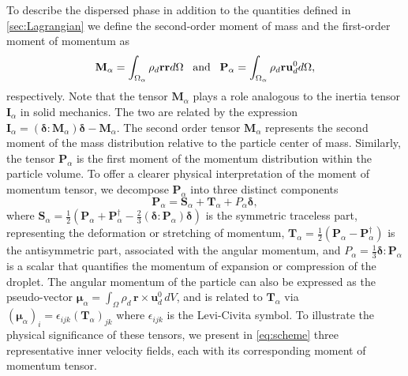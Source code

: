 To describe the dispersed phase in addition to the quantities defined in \ref{sec:Lagrangian} we define the second-order moment of mass and the first-order moment of momentum as 
\begin{equation}
    \textbf{M}_\alpha 
    = \intO{ \rho_d \textbf{r} \textbf{r} }
    \;\;\;\text{and}\;\;\;
    \textbf{P}_\alpha 
    = \intO{ \rho_d \textbf{r} \textbf{u}_d^0 },
    \label{eq:first_moment_of_momentum_def}
\end{equation}
respectively. 
Note that the tensor $\textbf{M}_\alpha$ plays a role analogous to the inertia tensor $\textbf{I}_\alpha$ in solid mechanics. 
The two are related by the expression  $\textbf{I}_\alpha = (\bm\delta : \textbf{M}_\alpha)\bm\delta - \textbf{M}_\alpha$.
The second order tensor $\textbf{M}_\alpha$ represents the second moment of the mass distribution relative to the particle center of mass.
Similarly, the tensor $\textbf{P}_\alpha$ is the first moment of the momentum distribution within the particle volume. 
To offer a clearer physical interpretation of the moment of momentum tensor, we decompose $\textbf{P}_\alpha$ into three distinct components  
\begin{equation}
\textbf{P}_\alpha = \textbf{S}_\alpha + \textbf{T}_\alpha + P_\alpha \bm\delta,
\end{equation}
where $\textbf{S}_\alpha = \frac{1}{2}\left(\textbf{P}_\alpha + \textbf{P}_\alpha^\dagger - \frac{2}{3}(\bm\delta:\textbf{P}_\alpha)\bm\delta\right)$ is the symmetric traceless part, representing the  deformation or stretching of momentum,
$\textbf{T}_\alpha = \frac{1}{2}(\textbf{P}_\alpha - \textbf{P}_\alpha^\dagger)$ is the antisymmetric part, associated with the angular momentum,
and $P_\alpha = \frac{1}{3} \bm\delta : \textbf{P}_\alpha$ is a scalar that quantifies the momentum of expansion or compression of the droplet. 
The angular momentum of the particle can also be expressed as the pseudo-vector  
$\bm\mu_\alpha = \int_\Omega \rho_d\, \textbf{r} \times \textbf{u}_d^0 \, dV$,
and is related to $\textbf{T}_\alpha$ via $(\bm\mu_\alpha)_i = \epsilon_{ijk} (\textbf{T}_\alpha)_{jk}$ %
where $\epsilon_{ijk}$ is the Levi-Civita symbol.
To illustrate the physical significance of these tensors, we present in \ref{eq:scheme} three representative inner velocity fields, each with its corresponding moment of momentum tensor.

